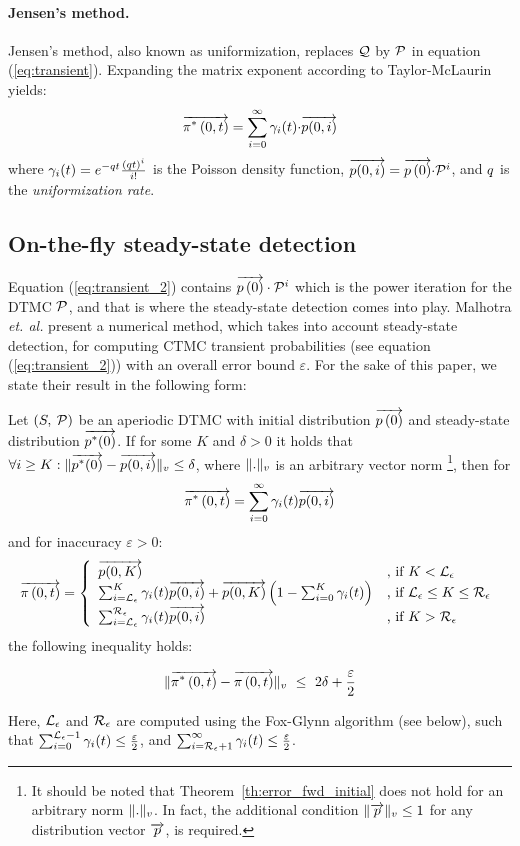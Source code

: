 \documentclass{entcs}
\newcommand{\SubSection}[1]{\subsection{#1}}
\begin{document}
	\paragraph{Jensen's method.}
		 Jensen's method, also known as uniformization, replaces $\mathcal{Q}$ by $\mathcal{P}$ in equation (\ref{eq:transient}).  Expanding the matrix exponent according to Taylor-McLaurin yields:
		\begin{equation}
			\overrightarrow{\pi^{*} \left(0, t \right )} = \sum_{i=0}^{\infty}\gamma_{i}(t) {\cdot} \overrightarrow{p(0,i)}
			\label{eq:transient_2}
		\end{equation}
		where $\gamma_{i}(t) = e^{-q t}\frac{\left( q t \right)^{i}}{i!}$ is the Poisson density function, $\overrightarrow{p(0,i)} = \overrightarrow{p \left( 0 \right)} {\cdot} \mathcal{P}^{i}$, and $q$ is the \emph{uniformization rate}.

	\SubSection{On-the-fly steady-state detection \label{ss:ofssd_trans}}
		
		Equation (\ref{eq:transient_2}) contains $\overrightarrow{p \left( 0 \right)} \cdot \mathcal{P}^{i}$ which is the power iteration for the DTMC $\mathcal{P}$, and that is where the steady-state detection comes into play.  Malhotra \emph{et. al.} \cite{MalhotraMT_MR94} present a numerical method, which takes into account steady-state detection, for computing CTMC transient probabilities (see equation (\ref{eq:transient_2})) with an overall error bound $\varepsilon$.  For the sake of this paper, we state their result in the following form:

		\begin{theorem}
			\label{th:error_fwd_initial}
			\cite{MalhotraMT_MR94} Let $\left( S,\: \mathcal{P} \right)$ be an aperiodic DTMC with initial distribution $\overrightarrow{p \left( 0 \right)}$ and steady-state distribution $\overrightarrow{p^{*}(0)}$. If for some $K$ and $\delta > 0$ it holds that $\forall i \geq K : \lVert \overrightarrow{p^{*}(0)} - \overrightarrow{p(0,i)} \rVert_{v} \leq \delta$, where $\lVert . \rVert_{v}$ is an arbitrary vector norm \footnote{It should be noted that Theorem~\ref{th:error_fwd_initial} does not hold for an arbitrary norm $\lVert . \rVert_{v}$. In fact, the additional  condition $\lVert \overrightarrow{p} \rVert_{v}\leq 1$ for any distribution vector $\overrightarrow{p}$, is required.}, then for
			{\small
			\[
				\overrightarrow{\pi^{*} \left(0, t \right )} = \sum_{i=0}^{\infty}\gamma_{i}(t) \overrightarrow{p(0,i)}
			\]
			}
			and for inaccuracy $\varepsilon > 0$:
			{\small
			\begin{equation}
				\displaystyle
				\overrightarrow{\pi \left(0, t \right )} = \left\{
				\begin{array}{ll}
					\overrightarrow{p(0,K)} & \text{, if } K < \mathcal{L}_{\epsilon}\\
					\sum_{i=\mathcal{L}_{\epsilon}}^{K}\gamma_{i}(t) \overrightarrow{p(0,i)} + \overrightarrow{p(0,K)} \left(1- \sum_{i=0}^{K}\gamma_{i}(t) \right) & \text{, if } \mathcal{L}_{\epsilon} \leq K \leq \mathcal{R}_{\epsilon}\\
					\sum_{i=\mathcal{L}_{\epsilon}}^{\mathcal{R}_{\epsilon}}\gamma_{i}(t) \overrightarrow{p(0,i)} & \text{, if } K > \mathcal{R}_{\epsilon}\\
				\end{array}
				\right .
				\label{eq:ssd_LR_initial}
			\end{equation}
			}
			the following inequality holds:
			{\small
			\begin{fframe}{0.6}{-0.0}
				\[
					\lVert \overrightarrow{\pi^{*} \left(0, t \right )} - \overrightarrow{\pi \left(0, t \right )} \rVert_{v} \ \leq \ 2 \delta + \frac{\varepsilon}{2}
				\]
			\end{fframe}
			}
			Here, $\mathcal{L}_{\epsilon}$ and $\mathcal{R}_{\epsilon}$ are computed using the Fox-Glynn algorithm (see below), such that $\sum_{i=0}^{\mathcal{L}_{\epsilon}-1} \gamma_{i}(t) \leq \frac{\varepsilon}{2}$, and $\sum_{i=\mathcal{R}_{\epsilon}+1}^{\infty} \gamma_{i}(t) \leq \frac{\varepsilon}{2}$.
		\end{theorem}
		
\end{document}
